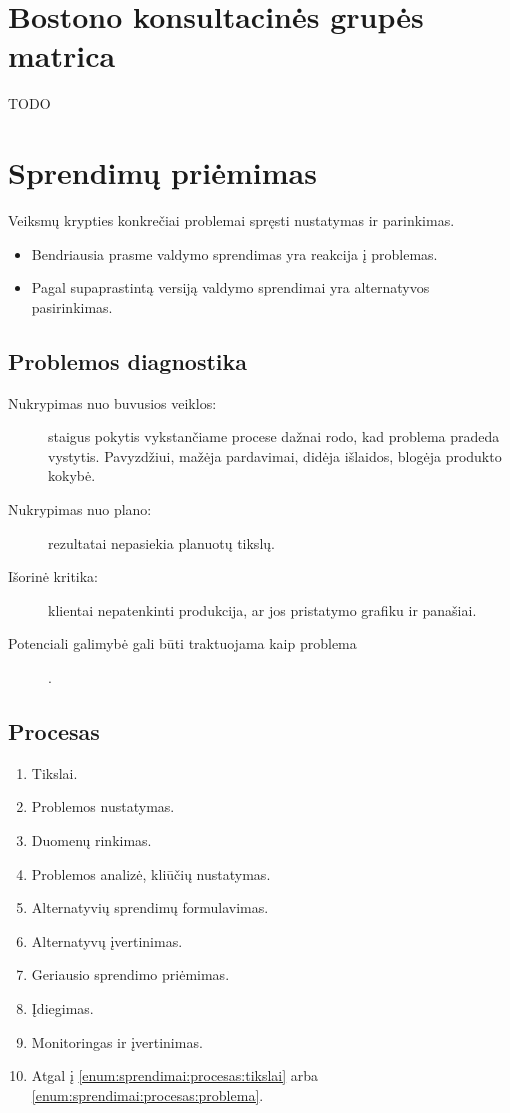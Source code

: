 \section{Bostono konsultacinės grupės matrica}

TODO

\section{Sprendimų priėmimas}

\begin{defn}
  Veiksmų krypties konkrečiai problemai spręsti nustatymas ir parinkimas.
  \begin{itemize}
    \item Bendriausia prasme valdymo sprendimas yra reakcija į problemas.
    \item Pagal supaprastintą versiją valdymo sprendimai yra alternatyvos
      pasirinkimas.
  \end{itemize}
\end{defn}

\subsection{Problemos diagnostika}

\begin{description}
  \item[Nukrypimas nuo buvusios veiklos:] staigus pokytis
    vykstančiame procese dažnai rodo, kad problema pradeda vystytis.
    Pavyzdžiui, mažėja pardavimai, didėja išlaidos, blogėja produkto
    kokybė.
  \item[Nukrypimas nuo plano:] rezultatai nepasiekia planuotų
    tikslų.
  \item[Išorinė kritika:] klientai nepatenkinti produkcija, ar jos
    pristatymo grafiku ir panašiai.
  \item[Potenciali galimybė gali būti traktuojama kaip problema] .
\end{description}

\subsection{Procesas}

\begin{enumerate}
  \item \label{enum:sprendimai:procesas:tikslai} Tikslai.
  \item \label{enum:sprendimai:procesas:problema} Problemos nustatymas.
  \item Duomenų rinkimas.
  \item Problemos analizė, kliūčių nustatymas.
  \item Alternatyvių sprendimų formulavimas.
  \item Alternatyvų įvertinimas.
  \item Geriausio sprendimo priėmimas.
  \item Įdiegimas.
  \item Monitoringas ir įvertinimas.
  \item Atgal į \ref{enum:sprendimai:procesas:tikslai} arba
    \ref{enum:sprendimai:procesas:problema}.
\end{enumerate}

